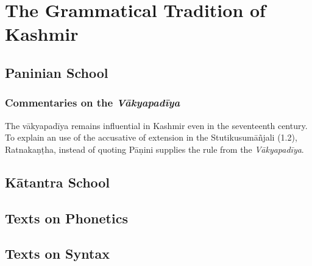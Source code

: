 \chapter{The Grammatical Tradition of Kashmir}

\section{Paninian School}

\subsection{Commentaries on the \emph{Vākyapadīya}}

The vākyapadīya remains influential in Kashmir even in the seventeenth century. To explain an use of the accusative of extension in the Stutikusumāñjali (1.2), Ratnakaṇṭha, instead of quoting Pāṇini supplies the rule from the \emph{Vākyapadīya}.  

\section{Kātantra School}

\section{Texts on Phonetics}

\section{Texts on Syntax}